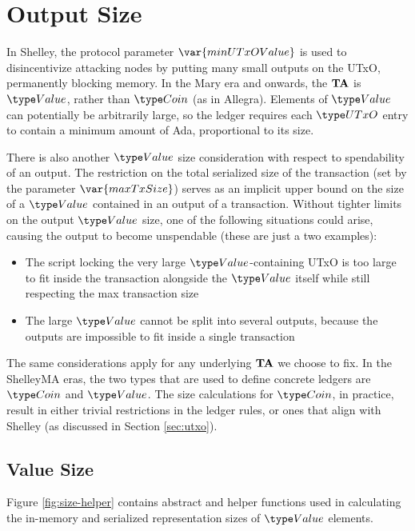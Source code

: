 \section{Output Size}
\label{sec:value-size}

In Shelley, the protocol parameter $\var{minUTxOValue}$ is used to
disincentivize attacking nodes by putting many small outputs on the
UTxO, permanently blocking memory. In the Mary era
and onwards, the $\mathbf{TA}$ is $\Value$, rather than $\Coin$ (as in Allegra). Elements of $\Value$
can potentially be arbitrarily large, so the ledger requires each $\UTxO$ entry to
contain a minimum amount of Ada, proportional to its size.

There is also another $\Value$ size consideration with respect to spendability
of an output. The restriction on the total serialized size of the transaction (set
by the parameter $\var{maxTxSize}$) serves as an implicit upper bound on the
size of a $\Value$ contained in an output of a transaction. Without tighter
limits on the output $\Value$ size, one of the following situations could arise,
causing the output to become unspendable (these are just a two examples):

\begin{itemize}
  \item The script locking the very large $\Value$-containing UTxO is too large
  to fit inside the transaction alongside the $\Value$ itself while still respecting
  the max transaction size
  \item The large $\Value$ cannot be split into several outputs, because the
  outputs are impossible to fit inside a single transaction
\end{itemize}

The same considerations apply for any underlying $\mathbf{TA}$ we choose to fix.
In the ShelleyMA eras, the two types that are used to define concrete ledgers are $\Coin$ and $\Value$.
The size calculations for $\Coin$, in practice,
result in either trivial restrictions in the ledger rules,
or ones that align with Shelley (as discussed in Section \ref{sec:utxo}).

\subsection{Value Size}

Figure \ref{fig:size-helper} contains abstract and helper functions
used in calculating the in-memory and serialized representation
sizes of $\Value$ elements.


